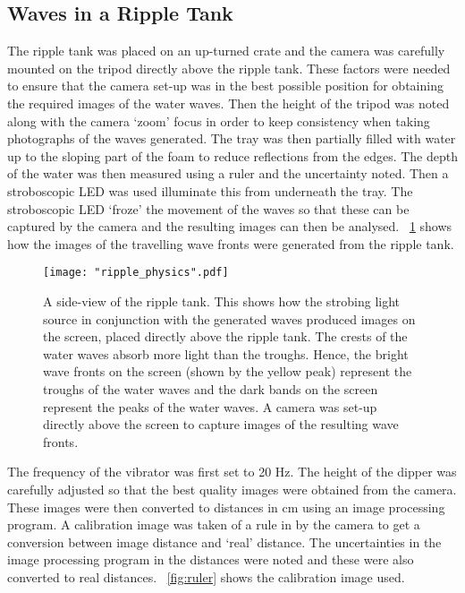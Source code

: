 \documentclass{article}
\newcommand{\figref}[2][\figurename~]{#1\ref{#2}}
\begin{document}
\subsection{Waves in a Ripple Tank}
\label{ssec:ripple-method}

\vspace{2mm}
\noindent
The ripple tank was placed on an up-turned crate and the camera was carefully mounted on the tripod directly above the ripple tank. These factors were needed to ensure that the camera set-up was in the best possible position for obtaining the required images of the water waves. Then the height of the tripod was noted along with the camera `zoom' focus in order to keep consistency when taking photographs of the waves generated. The tray was then partially filled with water up to the sloping part of the foam \cite{Paper01} to reduce reflections from the edges. The depth of the water was then measured using a ruler and the uncertainty noted. Then a stroboscopic LED was used illuminate this from underneath the tray. The stroboscopic LED `froze' the movement of the waves so that these can be captured by the camera and the resulting images can then be analysed. \figref{fig:ripple_setup} shows how the images of the travelling wave fronts were generated from the ripple tank.

\begin{figure}[h]
\centering
\texttt{[image: "ripple\_physics".pdf]}
\caption{A side-view of the ripple tank. This shows how the strobing light source in conjunction with the generated waves produced images on the screen, placed directly above the ripple tank. The crests of the water waves absorb more light than the troughs. Hence, the bright wave fronts on the screen (shown by the yellow peak) represent the troughs of the water waves and the dark bands on the screen represent the peaks of the water waves.  A camera was  set-up directly above the screen to capture images of the resulting wave fronts.}
\label{fig:ripple_setup}
\end{figure}

\newpage
\vspace{2mm}
\noindent
The frequency of the vibrator was first set to 20 Hz. The height of the dipper was carefully adjusted so that the best quality images were obtained from the camera. These images were then converted to distances in cm using an image processing program. A calibration image was taken of a rule in by the camera to get a conversion between image distance and `real' distance. The uncertainties in the image processing program in the distances were noted and these were also converted to real distances. \figref{fig:ruler} shows the calibration image used. 
\end{document}
